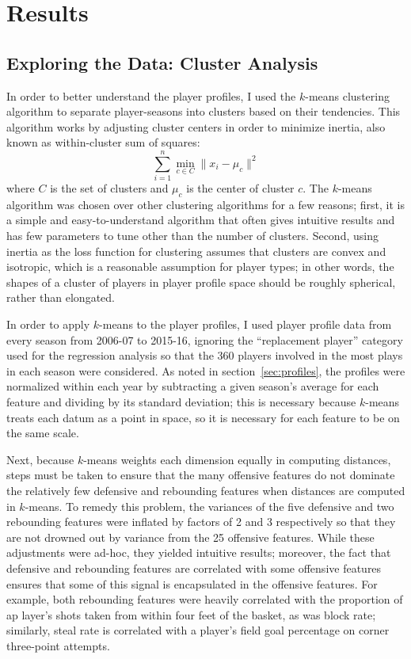
\chapter{Results}
\label{ch:results}

\section{Exploring the Data: Cluster Analysis}

In order to better understand the player profiles, I used the $k$-means clustering
algorithm to separate player-seasons into clusters based on their tendencies. This
algorithm works by adjusting cluster centers in order to minimize inertia, also
known as within-cluster sum of squares:
$$
\sum_{i=1}^n \min_{c \in C} \lVert x_i - \mu_c \rVert^2
$$
where $C$ is the set of clusters and $\mu_c$ is the center of cluster $c$. The
$k$-means algorithm was chosen over other clustering algorithms for a few reasons;
first, it is a simple and easy-to-understand algorithm that often gives intuitive
results and has few parameters to tune other than the number of clusters. Second,
using inertia as the loss function for clustering assumes that clusters are convex
and isotropic, which is a reasonable assumption for player types; in other words,
the shapes of a cluster of players in player profile space should be roughly
spherical, rather than elongated.

In order to apply $k$-means to the player profiles, I used player profile data from
every season from 2006-07 to 2015-16, ignoring the ``replacement player'' category
used for the regression analysis so that the 360 players involved in the most plays
in each season were considered. As noted in section~\ref{sec:profiles}, the profiles
were normalized within each year by subtracting a given season's average for each
feature and dividing by its standard deviation; this is necessary because $k$-means
treats each datum as a point in space, so it is necessary for each feature to be on
the same scale.

Next, because $k$-means weights each dimension equally in computing distances, steps
must be taken to ensure that the many offensive features do not dominate the
relatively few defensive and rebounding features when distances are computed in
$k$-means. To remedy this problem, the variances of the five defensive and two
rebounding features were inflated by factors of 2 and 3 respectively so that they
are not drowned out by variance from the 25 offensive features. While these
adjustments were ad-hoc, they yielded intuitive results; moreover, the fact that
defensive and rebounding features are correlated with some offensive features
ensures that some of this signal is encapsulated in the offensive features. For
example, both rebounding features were heavily correlated with the proportion of ap
layer's shots taken from within four feet of the basket, as was block rate;
similarly, steal rate is correlated with a player's field goal percentage on corner
three-point attempts.


